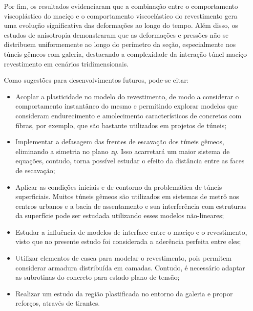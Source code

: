 Por fim, os resultados evidenciaram que a combinação entre o comportamento viscoplástico do maciço e o comportamento viscoelástico do revestimento gera uma evolução significativa das deformações ao longo do tempo. Além disso, os estudos de anisotropia demonstraram que as deformações e pressões não se distribuem uniformemente ao longo do perímetro da seção, especialmente nos túneis gêmeos com galeria, destacando a complexidade da interação túnel-maciço-revestimento em cenários tridimensionais.


Como sugestões para desenvolvimentos futuros, pode-se citar:
\begin{itemize}
	\item Acoplar a plasticidade no modelo do revestimento, de modo a considerar o comportamento instantâneo do mesmo e permitindo explorar modelos que consideram endurecimento e amolecimento característicos de concretos com fibras, por exemplo, que são bastante utilizados em projetos de túneis;
	
	\item Implementar a defasagem das frentes de escavação dos túneis gêmeos, eliminando a simetria no plano \textit{zy}. Isso acarretará um maior sistema de equações, contudo, torna possível estudar o efeito da distância entre as faces de escavação;
	
	\item Aplicar as condições iniciais e de contorno da problemática de túneis superficiais. Muitos túneis gêmeos são utilizados em sistemas de metrô nos centros urbanos e a bacia de assentamento e sua interferência com estruturas da superfície pode ser estudada utilizando esses modelos não-lineares;
	
	
	\item Estudar a influência de modelos de interface entre o maciço e o revestimento, visto que no presente estudo foi considerada a aderência perfeita entre eles;
	
	\item Utilizar elementos de casca para modelar o revestimento, pois permitem considerar armadura distribuída em camadas. Contudo, é necessário adaptar as subrotinas do concreto para estado plano de tensão;
	
	\item Realizar um estudo da região plastificada no entorno da galeria e propor reforços, através de tirantes.
\end{itemize}
